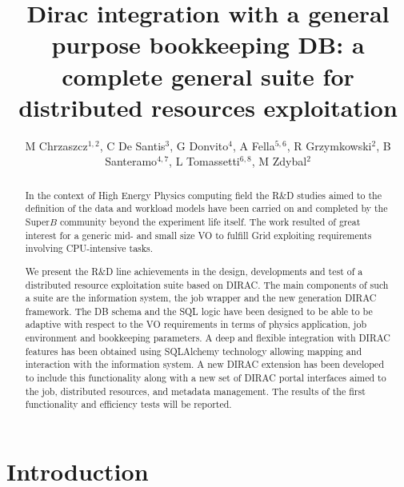 \documentclass[a4paper]{jpconf}
\begin{document}
\title{Dirac integration with a general purpose bookkeeping DB: a complete general suite for distributed resources exploitation}

\author{M Chrzaszcz$^{1,2}$, C De Santis$^3$, G Donvito$^4$, A Fella$^{5,6}$, R Grzymkowski$^2$, B Santeramo$^{4,7}$, L Tomassetti$^{6,8}$, M Zdybal$^2$}
\address{$^1$ Physik-Institut, Universitat Zurich, Zurich, Switzerland}
\address{$^2$ Henryk Niewodniczanski Institute of Nuclear Physics Polish Academy of Sciences, Krakow, Poland}
\address{$^3$ INFN - Sezione di Roma Tor Vergata, Roma, Italy}
\address{$^4$ INFN - Sezione di Bari, Bari, Italy}
\address{$^5$ NFN - Sezione di Pisa, Pisa, Italy}
\address{$^6$ Dipartimento di Matematica e Informatica, Universit\'a di Ferrara, Ferrara, Italy}
\address{$^7$ Dipartimento di Fisica dell’Universit\'a e del Politecnico di Bari, Bari, Italy}
\address{$^8$ INFN - Sezione di Ferrara, Ferrara, Italy}

\begin{abstract}
In the context of High Energy Physics computing field the R\&D studies aimed to
the definition of the data and workload models have been carried on and 
completed by the Super$B$ community beyond the experiment life itself.
The work resulted of great interest for a generic mid- and small size VO to 
fulfill Grid exploiting requirements involving CPU-intensive tasks.

We present the R\&D line achievements in the design, developments and test of a
distributed resource exploitation suite based on DIRAC. The main components of
such a suite are the information system, the job wrapper and the new generation
DIRAC framework. The DB schema and the SQL logic have been designed to be able
to be adaptive with respect to the VO requirements in terms of physics 
application, job environment and bookkeeping parameters. A deep and flexible 
integration with DIRAC features has been obtained using SQLAlchemy technology
allowing mapping and interaction with the information system. A new DIRAC
extension has been developed to include this functionality along with a new set
of DIRAC portal interfaces aimed to the job, distributed resources, and
metadata management. The results of the first functionality and efficiency
tests will be reported.
\end{abstract}

\section{Introduction}
\end{document}

